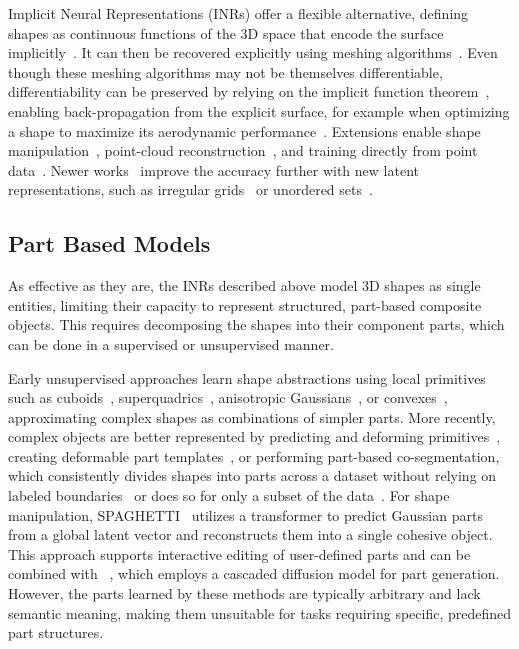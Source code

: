 Implicit Neural Representations (INRs) offer a flexible alternative, defining shapes as continuous functions of the 3D space that encode  the surface implicitly~\cite{Park19c, Mescheder19, Chen19c, Xu19b}. It can then be recovered explicitly using meshing algorithms~\cite{Lorensen87, Lewiner03, Ju02}. Even though these meshing algorithms may not be themselves differentiable, differentiability can be preserved by relying on the implicit function theorem~\cite{Guillard24a}, enabling back-propagation from the explicit surface, for example when optimizing a shape to maximize its aerodynamic performance~\cite{Baque18}. Extensions enable shape manipulation~\cite{Hao20a}, point-cloud reconstruction~\cite{Peng20c}, and training directly from point data~\cite{Atzmon20, Gropp20}. Newer works~\cite{Sitzmann20, Takikawa21} improve the accuracy further with new latent representations, such as irregular grids~\cite{Zhang22b} or unordered sets~\cite{Zhang23d}.



\subsection{Part Based Models}

As effective as they are, the INRs described above model 3D shapes as single entities, limiting their capacity to represent structured, part-based composite objects. This requires decomposing the shapes into their component parts, which can be done in a supervised or unsupervised manner. 


Early unsupervised approaches learn shape abstractions using local primitives such as cuboids~\cite{Tulsiani17b, Zou17a, Sun19b, Smirnov20, Yang21a}, superquadrics~\cite{Paschalidou19, Paschalidou20}, anisotropic Gaussians~\cite{Genova19}, or convexes~\cite{Deng20c}, approximating complex shapes as combinations of simpler parts. More recently, complex objects are better represented by predicting and deforming primitives~\cite{Paschalidou21, Shuai23}, creating deformable part templates~\cite{Hui22, Chen24b}, or performing part-based co-segmentation, which consistently divides shapes into parts across a dataset without relying on labeled boundaries~\cite{Hertz22} or does so for only a subset of the data~\cite{Chen19i}. For shape manipulation, SPAGHETTI~\cite{Hertz22} utilizes a transformer to predict Gaussian parts from a global latent vector and reconstructs them into a single cohesive object. This approach supports interactive editing of user-defined parts and can be combined with \SALAD~\cite{Koo23}, which employs a cascaded diffusion model for part generation.
%
However, the parts learned by these methods are typically arbitrary and lack semantic meaning, making them unsuitable for tasks requiring specific, predefined part structures.


